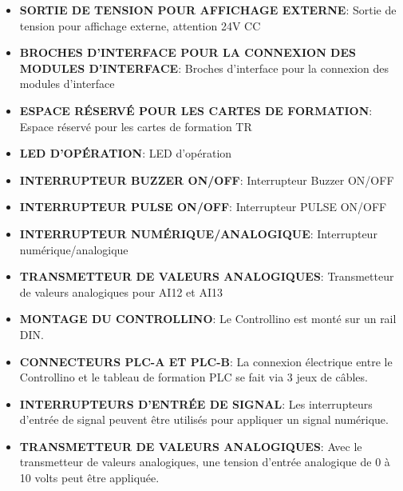 \documentclass[a4paper,12pt]{report}
\begin{document}
\begin{itemize}
    \item \textbf{SORTIE DE TENSION POUR AFFICHAGE EXTERNE}:
    Sortie de tension pour affichage externe, attention 24V CC\\
    
    \item \textbf{BROCHES D'INTERFACE POUR LA CONNEXION DES MODULES D'INTERFACE}:
    Broches d'interface pour la connexion des modules d'interface\\
    
    \item \textbf{ESPACE RÉSERVÉ POUR LES CARTES DE FORMATION}:
    Espace réservé pour les cartes de formation TR\\
    
    \item \textbf{LED D'OPÉRATION}:
    LED d'opération\\
    
    \item \textbf{INTERRUPTEUR BUZZER ON/OFF}:
    Interrupteur Buzzer ON/OFF\\
    
    \item \textbf{INTERRUPTEUR PULSE ON/OFF}:
    Interrupteur PULSE ON/OFF\\
    
    \item \textbf{INTERRUPTEUR NUMÉRIQUE/ANALOGIQUE}:
    Interrupteur numérique/analogique\\
    
    \item \textbf{TRANSMETTEUR DE VALEURS ANALOGIQUES}:
    Transmetteur de valeurs analogiques pour AI12 et AI13\\
    
    \item \textbf{MONTAGE DU CONTROLLINO}:
    Le Controllino est monté sur un rail DIN.\\
    
    \item \textbf{CONNECTEURS PLC-A ET PLC-B}:
    La connexion électrique entre le Controllino et le tableau de formation PLC se fait via 3 jeux de câbles.\\
    
    \item \textbf{INTERRUPTEURS D'ENTRÉE DE SIGNAL}:
    Les interrupteurs d'entrée de signal peuvent être utilisés pour appliquer un signal numérique.\\
    
    \item \textbf{TRANSMETTEUR DE VALEURS ANALOGIQUES}:
    Avec le transmetteur de valeurs analogiques, une tension d'entrée analogique de 0 à 10 volts peut être appliquée.\\
    

\end{itemize}
\end{document}
